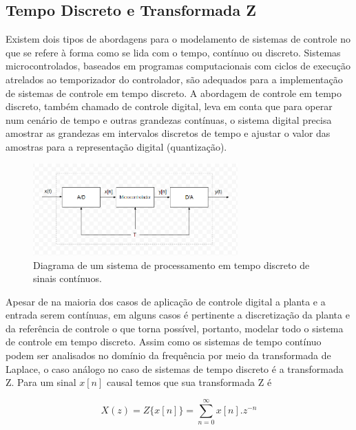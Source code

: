 \subsection{Tempo Discreto e Transformada Z}

Existem dois tipos de abordagens para o modelamento de sistemas de controle no que se refere à forma como se lida com o tempo, contínuo ou discreto. Sistemas microcontrolados, baseados em programas computacionais com ciclos de execução atrelados ao temporizador do controlador, são adequados para a implementação de sistemas de controle em tempo discreto. A abordagem de controle em tempo discreto, também chamado de controle digital, leva em conta que para operar num cenário de tempo e outras grandezas contínuas, o sistema digital precisa amostrar as grandezas em intervalos discretos de tempo e ajustar o valor das amostras para a representação digital (quantização). 

\begin{figure}[ht]
    \begin{center}
    \includegraphics[width=0.7\textwidth]{figuras/discreto.PNG}
    \end{center}
    \caption[Diagrama de um sistema de processamento em tempo discreto.]{Diagrama de um sistema de processamento em tempo discreto de sinais contínuos.}
    \label{disc}
\end{figure}

Apesar de na maioria dos casos de aplicação de controle digital a planta e a entrada serem contínuas, em alguns casos é pertinente a discretização da planta e da referência de controle o que torna possível, portanto, modelar todo o sistema de controle em tempo discreto. Assim como os sistemas de tempo contínuo podem ser analisados no domínio da frequência por meio da transformada de Laplace, o caso análogo no caso de sistemas de tempo discreto é a transformada Z. Para um sinal $x[n]$ causal temos que sua transformada Z é

\begin{equation}
    \label{eq:cd_1}
    X(z) = Z\{x[n]\} = \sum_{n=0}^{\infty} x[n].z^{-n} 
\end{equation}

